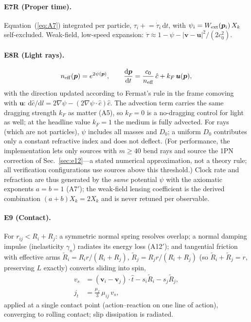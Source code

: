 \documentclass[aps,reprint,amsmath,amssymb,nofootinbib,superscriptaddress,floatfix]{revtex4-2}
\newcommand{\ud}{\mathrm{d}}
\newcommand{\vect}[1]{\bm{#1}}
\newcommand{\Kt}{X_k}
\newcommand{\Dz}{D_0}
\begin{document}
\paragraph*{E7R (Proper time).}
Equation~(\ref{eq:A7}) integrated per particle,
$\tau_i \mathrel{+}= \dot\tau_i\,\ud t$, with
$\psi_i = W_{\rm ext}(\vect{p}_i)\,\Kt$ self-excluded.
Weak-field, low-speed expansion:
$\dot\tau \approx 1 - \psi - |\vect{v}-\vect{u}|^2/(2c_0^2)$.

\paragraph*{E8R (Light rays).}
\begin{equation}
n_{\rm eff}(\vect{p}) = e^{2\psi(\vect{p})},\qquad
\frac{\ud\vect{p}}{\ud t}
 = \frac{c_0}{n_{\rm eff}}\,\hat{c} + k_F\,\vect{u}(\vect{p}),
\label{eq:E8}
\end{equation}
with the direction updated according to Fermat's rule in the frame
comoving with
$\vect{u}$:
$\ud\hat{c}/\ud l = 2\nabla\psi - (2\nabla\psi\cdot\hat{c})\hat{c}$.
The advection term carries the same dragging strength $k_F$ as matter
(A5), so $k_F = 0$ is a no-dragging control for light as well; at the
headline value $k_F = 1$ the medium is fully advected.
For rays (which are not particles), $\psi$ includes all masses and
$\Dz$; a uniform $\Dz$ contributes only a constant refractive index and
does not deflect.
(For performance, the implementation lets only sources with
$m \ge 40$ bend rays and source the 1PN correction of
Sec.~\ref{sec:e12}---a stated numerical approximation, not a theory
rule; all verification configurations use sources above this
threshold.)
Clock rate and refraction are thus generated by the \emph{same}
potential $\psi$ with the axiomatic exponents $a = b = 1$ (A7$'$); the
weak-field lensing coefficient is the derived combination
$(a+b)\Kt = 2\Kt$ and is never retuned per observable.

\paragraph*{E9 (Contact).}
For $r_{ij} < R_i + R_j$: a symmetric normal spring resolves overlap; a
normal damping impulse (inelasticity $\gamma_n$) radiates its energy
loss (A12$'$); and tangential friction with effective arms
$\tilde R_i = R_i r/(R_i{+}R_j)$, $\tilde R_j = R_j r/(R_i{+}R_j)$
(so $\tilde R_i + \tilde R_j = r$, preserving $L$ exactly) converts
sliding into spin,
\begin{align}
v_s &= (\vect{v}_i-\vect{v}_j)\cdot\hat{t}
 - s_i\tilde R_i - s_j\tilde R_j,\nonumber\\
j_t &= \tfrac{\mu_f}{3}\,\mu_{ij}\,v_s,
\label{eq:E9}
\end{align}
applied at a single contact point (action--reaction on one line of
action), converging to rolling contact; slip dissipation is radiated.
\end{document}
